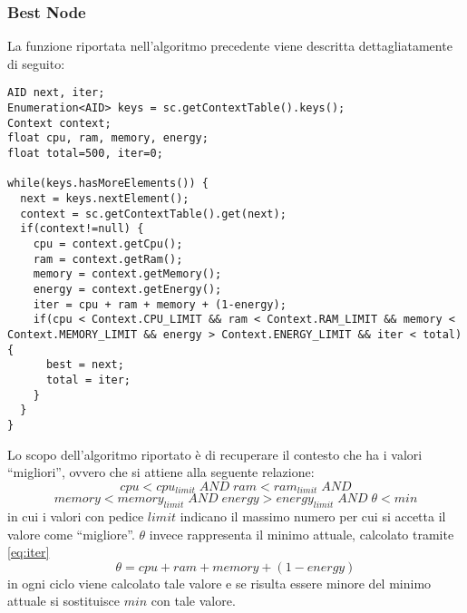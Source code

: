 \subsubsection{Best Node}
La funzione  riportata nell'algoritmo precedente viene descritta dettagliatamente di seguito:
\begin{lstlisting}[frame=trBL]
AID next, iter;
Enumeration<AID> keys = sc.getContextTable().keys();
Context context;
float cpu, ram, memory, energy;
float total=500, iter=0;

while(keys.hasMoreElements()) {
  next = keys.nextElement();
  context = sc.getContextTable().get(next);
  if(context!=null) {
    cpu = context.getCpu();
    ram = context.getRam();
    memory = context.getMemory();
    energy = context.getEnergy();
    iter = cpu + ram + memory + (1-energy);
    if(cpu < Context.CPU_LIMIT && ram < Context.RAM_LIMIT && memory < Context.MEMORY_LIMIT && energy > Context.ENERGY_LIMIT && iter < total) {
      best = next;
      total = iter;
    }
  }
}
\end{lstlisting}
Lo scopo dell'algoritmo riportato è di recuperare il contesto che ha i valori ``migliori'', ovvero che si attiene alla seguente relazione:
$$
cpu < cpu_{limit} \;AND\; ram < ram_{limit}\; AND
$$
$$
memory < memory_{limit} \;AND\; energy > energy_{limit}\; AND\; \theta < min
$$
in cui i valori con pedice $limit$ indicano il massimo numero per cui si accetta il valore come ``migliore''. $\theta$ invece rappresenta il minimo attuale, calcolato tramite \ref{eq:iter}
\begin{equation}\label{eq:iter}
\theta = cpu + ram + memory + (1-energy)
\end{equation}
in ogni ciclo viene calcolato tale valore e se risulta essere minore del minimo attuale si sostituisce $min$ con tale valore.